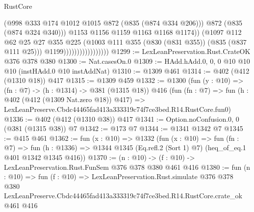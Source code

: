 \begin{lexlean}{RustCore}
\begin{coremodule}
                                          (@998 @333 @174 @1012 @1015 @872 (@835 (@874 @334 @206)))
                                          @872
                                          (@835 (@874 @324 @340)))
                                        @1153
                                        @1156
                                        @1159
                                        @1163
                                        @1168
                                        @1174))
                                    (@1097
                                      @112
                                      @62
                                      @25
                                      @27
                                      @355
                                      @225
                                      (@1003 @111 @355 (@830 (@831 @355)) (@835 (@837 @111 @25)))
                                      @1199)))))))))))))))))
@1299 := LexLeanPreservation.Rust.CrateOK @376 @378 @380
@1300 := Nat.casesOn.{0}
@1309 := HAdd.hAdd.{0, 0, 0} @10 @10 @10 (instHAdd.{0} @10 instAddNat)
@1310 := @1309 @461
@1314 := @402 (@412 (@1310 @18)) @417
@1315 := @1309 @459
@1332 := @1300
    (fun (y : @10) => (fn : @7) -> (h : @1314) -> @381 (@1315 @18))
    @416
    (fun (fn : @7) =>
    fun (h : @402 (@412 (@1309 Nat.zero @18)) @417) =>
    LexLeanPreserve.Cbdc44465fad413a333319c74f7ce3bed.R14.RustCore.fun0)
@1336 := @402 (@412 (@1310 @38)) @417
@1341 := Option.noConfusion.{0, 0} (@381 (@1315 @38)) @7
@1342 := @173 @7
@1344 := @1341 @1342 @7
@1345 := @415 @461
@1362 := fun (x : @10) =>
  @1332
    (fun (x : @10) =>
    fun (fn : @7) =>
    fun (h : @1336) => @1344 @1345 (Eq.refl.{2} (Sort 1) @7) (heq_of_eq.{1} @401 @1342 @1345 @416))
@1370 := (n : @10) -> (f : @10) -> LexLeanPreservation.Rust.FunSem @376 @378 @380 @461 @416
@1380 := fun (n : @10) =>
  fun (f : @10) =>
  LexLeanPreservation.Rust.simulate
    @376
    @378
    @380
    LexLeanPreserve.Cbdc44465fad413a333319c74f7ce3bed.R14.RustCore.crate_ok
    @461
    @416
\end{coremodule}
\end{lexlean}
